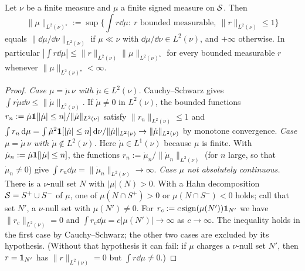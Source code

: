 \begin{lemma}\label{lem:fb-dual}
Let $\nu$ be a finite measure and $\mu$ a finite signed measure on $\mathcal{S}$. Then
\[
\|\mu\|_{L^2(\nu)^\star}:=\sup\Big\{\int r\dd\mu:\ r\text{ bounded measurable},\ \|r\|_{L^2(\nu)}\le1\Big\}
\]
equals $\|\dd\mu/\dd\nu\|_{L^2(\nu)}$ if $\mu\ll\nu$ with $\dd\mu/\dd\nu\in L^2(\nu)$, and $+\infty$ otherwise.
In particular $|\int r\dd\mu|\le\|r\|_{L^2(\nu)}\|\mu\|_{L^2(\nu)^\star}$ for every bounded measurable $r$ whenever $\|\mu\|_{L^2(\nu)^\star}<\infty$.
\end{lemma}
\begin{proof}
\emph{Case $\mu=\dot\mu\,\nu$ with $\dot\mu\in L^2(\nu)$.} Cauchy--Schwarz gives $\int r\dot\mu\dd\nu\le\|\dot\mu\|_{L^2(\nu)}$. If $\dot\mu\ne0$ in $L^2(\nu)$, the bounded functions $r_n:=\dot\mu\mathbf{1}[|\dot\mu|\le n]/\|\dot\mu\|_{L^2(\nu)}$ satisfy $\|r_n\|_{L^2(\nu)}\le1$ and $\int r_n\,\mathrm{d}\mu=\int\dot\mu^2\mathbf{1}[|\dot\mu|\le n]\,\mathrm{d}\nu/\|\dot\mu\|_{L^2(\nu)}\to\|\dot\mu\|_{L^2(\nu)}$ by monotone convergence.
\emph{Case $\mu=\dot\mu\,\nu$ with $\dot\mu\notin L^2(\nu)$.} Here $\dot\mu\in L^1(\nu)$ because $\mu$ is finite. With $\dot\mu_n:=\dot\mu\mathbf{1}[|\dot\mu|\le n]$, the functions $r_n:=\dot\mu_n/\|\dot\mu_n\|_{L^2(\nu)}$ (for $n$ large, so that $\dot\mu_n\ne0$) give $\int r_n\dd\mu=\|\dot\mu_n\|_{L^2(\nu)}\to\infty$.
\emph{Case $\mu$ not absolutely continuous.} There is a $\nu$-null set $N$ with $|\mu|(N)>0$. With a Hahn decomposition $\mathcal{S}=S^+\cup S^-$ of $\mu$, one of $\mu(N\cap S^+)>0$ or $\mu(N\cap S^-)<0$ holds; call that set $N'$, a $\nu$-null set with $\mu(N')\ne0$.
For $r_c:=c\,\mathrm{sign}(\mu(N'))\mathbf{1}_{N'}$ we have $\|r_c\|_{L^2(\nu)}=0$ and $\int r_c\dd\mu=c|\mu(N')|\to\infty$ as $c\to\infty$.
The inequality holds in the first case by Cauchy--Schwarz; the other two cases are excluded by its hypothesis. (Without that hypothesis it can fail: if $\mu$ charges a $\nu$-null set $N'$, then $r=\mathbf{1}_{N'}$ has $\|r\|_{L^2(\nu)}=0$ but $\int r\dd\mu\ne0$.)
\end{proof}

